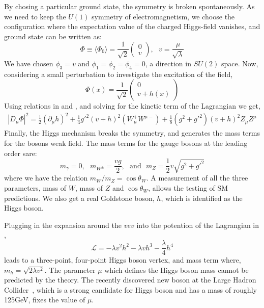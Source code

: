By chosing a particular ground state, the symmetry is broken spontaneously. As we need to keep the $U(1)$ symmetry of electromagnetism,
we choose the configuration where the expectation value of the charged Higgs-field vanishes, and ground state can be written as:
\begin{equation}
\Phi\equiv\langle\Phi_{0}\rangle=\frac{1}{\sqrt{2}}\left(\begin{array}{c} 0 \\ v \end{array}\right), \:\:\: v =\frac{\mu}{\sqrt{\lambda}}
\end{equation}
We have chosen $\phi_{3}=v$ and $\phi_{1}=\phi_{2}=\phi_{4}=0$, a direction in $SU(2)$ space. Now, considering a small perturbation to 
investigate the excitation of the field,
\begin{equation}
\Phi(x) = \frac{1}{\sqrt{2}} \left(\begin{array}{c} 0 \\ v + h(x) \end{array}\right)
\end{equation}
Using relations in \eqn{\ref{eq:AZ}} and \eqn{\ref{eq:CovDer}}, and solving for the kinetic term of the Lagrangian we get,
\begin{eqnarray}
|D_{\mu}\Phi|^{2} = \frac{1}{2}(\partial_{\mu}h)^{2}  + \frac{1}{4}g'^{2}(v+h)^{2}(W_{\mu}^{+}W^{\mu-}) + 
                    \frac{1}{8}(g^{2} + g'^{2})(v+h)^{2}Z_{\mu}Z^{\mu}
\end{eqnarray}
Finally, the Higgs mechanism breaks the symmetry, and generates the mass terms for the bosons weak field. The mass terms for the gauge bosons at 
the leading order sare:
\begin{equation}
m_{\gamma} = 0,\:\:\:m_{W^{\pm}} = \frac{vg}{2}, \:\:\:\text{and}\:\:\:m_{Z}=\frac{1}{2}v\sqrt{g^{2}+g'^{2}}
\end{equation}
where we have the relation $m_{W}/m_{Z}=\cos\theta_{W}$. A measurement of all the three parameters, mass of $W$, mass of $Z$ and
$\cos\theta_{W}$, allows the testing of SM predictions. We also get a real Goldstone boson, $h$, which is identified as the Higgs boson.

Plugging in the expansion around the $vev$ into the potention of the Lagrangian in \eqn{\ref{eq:HiggsLag}}, 
\begin{equation}
\mathcal{L} = -\lambda v^{2}h^{2} - \lambda v h^{3} - \frac{\lambda}{4}h^{4}
\end{equation}
leads to a three-point, four-point Higgs boson vertex, and mass term where, $m_{h}=\sqrt{2\lambda v^{2}}$. The parameter $\mu$ which
defines the Higgs boson mass cannot be predicted by the theory. The recently discovered new boson at the Large Hadron 
Collider~\cite{Chatrchyan:2012xdj,Aad:2012tfa}, which is a strong candidate for Higgs boson and has a mass of roughly 125\unit{GeV}, fixes the 
value of $\mu$. 

